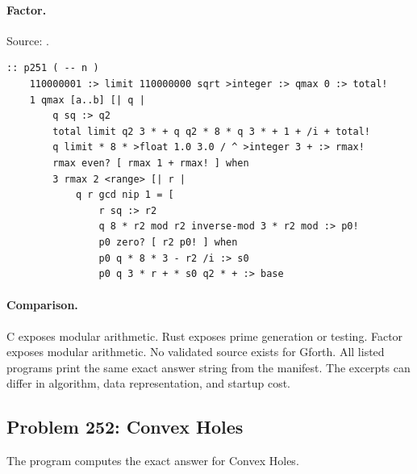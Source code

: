 \paragraph{Factor.} Source: .
\begin{lstlisting}
:: p251 ( -- n )
    110000001 :> limit 110000000 sqrt >integer :> qmax 0 :> total!
    1 qmax [a..b] [| q |
        q sq :> q2
        total limit q2 3 * + q q2 * 8 * q 3 * + 1 + /i + total!
        q limit * 8 * >float 1.0 3.0 / ^ >integer 3 + :> rmax!
        rmax even? [ rmax 1 + rmax! ] when
        3 rmax 2 <range> [| r |
            q r gcd nip 1 = [
                r sq :> r2
                q 8 * r2 mod r2 inverse-mod 3 * r2 mod :> p0!
                p0 zero? [ r2 p0! ] when
                p0 q * 8 * 3 - r2 /i :> s0
                p0 q 3 * r + * s0 q2 * + :> base
\end{lstlisting}

\paragraph{Comparison.}
C exposes modular arithmetic. Rust exposes prime generation or testing. Factor exposes modular arithmetic.
No validated source exists for Gforth.
All listed programs print the same exact answer string from the manifest. The excerpts can differ in algorithm, data representation, and startup cost.

\subsection{Problem 252: Convex Holes}
\label{walkthrough:p252}
The program computes the exact answer for Convex Holes.

